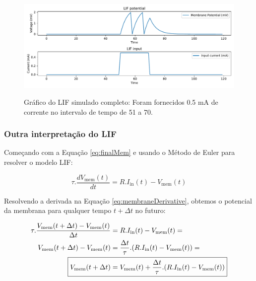 			
			
			\begin{figure}[H]
				\centering
				\caption[Gráfico do LIF]{Gráfico do LIF simulado completo: Foram fornecidos 0.5 mA de corrente no intervalo de tempo de 51 a 70.}
				\includegraphics[width=.8\linewidth]{images/membranePotentialFull}
				\label{fig:membranepotentialfull}
			\end{figure}

			
		\subsubsection{Outra interpretação do LIF}
			
			\par Começando com a Equação \autoref{eq:finalMem} e usando o Método de Euler para resolver o modelo LIF:
			
			\begin{equation}
				\tau.\dfrac{dV_{\text{mem}}(t)}{dt} = R.I_{\text{in}}(t) - V_{\text{mem}}(t)
			\end{equation}
			
			\par Resolvendo a derivada na Equação \autoref{eq:membraneDerivative}, obtemos o potencial da membrana para qualquer tempo $t+\Delta t$ no futuro:
			
			\begin{equation}
				\label{eq:membraneDerivative}
				\begin{aligned}
					\tau.\dfrac{V_{\text{mem}}(t+\Delta t) - V_{\text{mem}}(t)}{\Delta t} &= R.I_{\text{in}}(t) - V_{\text{mem}}(t) = \\
					V_{\text{mem}}(t+\Delta t) - V_{\text{mem}}(t) &= \frac{\Delta t}{\tau} . (R.I_{\text{in}}(t) - V_{\text{mem}}(t)) = \\
					\Aboxed{V_{\text{mem}}(t+\Delta t) &= V_{\text{mem}}(t) + \frac{\Delta t}{\tau} . (R.I_{\text{in}}(t) - V_{\text{mem}}(t))}
				\end{aligned}
			\end{equation}

